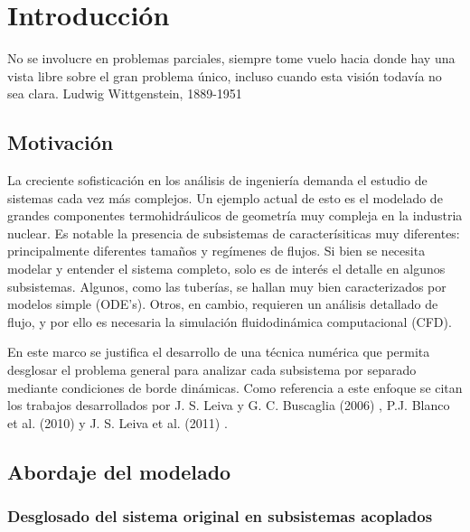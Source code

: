 \chapter{Introducción}
\label{chap1}
\chapterquote
{No se involucre en problemas parciales,
siempre tome vuelo hacia donde hay una vista libre sobre el gran problema único,
incluso cuando esta visión todavía no sea clara.}
{Ludwig Wittgenstein, 1889-1951}

\section{Motivación}
\label{1:motivacion}

La creciente sofisticación en los análisis de ingeniería demanda el estudio de sistemas cada vez más complejos.
Un ejemplo actual de esto es el modelado de grandes componentes termohidráulicos de geometría muy compleja en la industria nuclear. 
Es notable la presencia de subsistemas de caracterísiticas muy diferentes: principalmente diferentes tamaños y regímenes de flujos. 
Si bien se necesita modelar y entender el sistema completo, solo es de interés el detalle en algunos subsistemas. 
Algunos, como las tuberías, se hallan muy bien caracterizados por modelos simple (ODE's).
Otros, en cambio, requieren un análisis detallado de flujo, y por ello es necesaria la simulación fluidodinámica computacional (CFD).

En este marco se justifica el desarrollo de una técnica numérica que permita desglosar el problema general 
para analizar cada subsistema por separado mediante condiciones de borde dinámicas.
Como referencia a este enfoque se citan los trabajos desarrollados por J. S. Leiva y G. C. Buscaglia (2006) \cite{coup-0d3d}, P.J. Blanco et al. (2010) \cite{coup-black} y J. S. Leiva et al. (2011) \cite{coup-hyd}.

\section{Abordaje del modelado}
\label{1:abordaje}

\subsection*{Desglosado del sistema original en subsistemas acoplados}
\label{1:acoplamiento}

